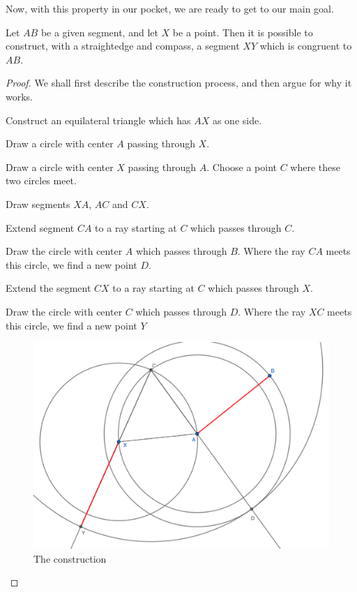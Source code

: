 \documentclass[12pt]{article}
\newenvironment{theorem}[2][Theorem]{\begin{trivlist}
\item[\hskip \labelsep {\bfseries #1}\hskip \labelsep {\bfseries #2.}]}{\end{trivlist}}
\begin{document}
Now, with this property in our pocket, we are ready to get to our main goal.
\clearpage

\begin{theorem}{I.2}[Euclid's Proposition 2 from Book I of \emph{The Elements}]
Let $AB$ be a given segment, and let $X$ be a point. Then it is possible to construct, with a straightedge and compass, a segment $XY$ which is congruent to $AB$.
\end{theorem}
 
\begin{proof}
We shall first describe the construction process, and then argue for why it works. 
\begin{compactenum}
\item Construct an equilateral triangle which has $AX$ as one side.
	\begin{compactenum}
	\item Draw a circle with center $A$ passing through $X$.
	\item Draw a circle with center $X$ passing through $A$. Choose a point $C$ where these two circles meet.
	\item Draw segments $XA$, $AC$ and $CX$.
	\end{compactenum}
\item Extend segment $CA$ to a ray starting at $C$ which passes through $C$.
\item Draw the circle with center $A$ which passes through $B$. Where the ray $CA$ meets this circle, we find a new point $D$.
\item Extend the segment $CX$ to a ray starting at $C$ which passes through $X$.
\item Draw the circle with center $C$ which passes through $D$. Where the ray $XC$ meets this circle, we find a new point $Y$
\end{compactenum}

\begin{figure}[ht]
\centering
\includegraphics[width=.65\textwidth]{example2-img.png}
\caption{The construction}
\end{figure}


\end{proof}
\end{document}

